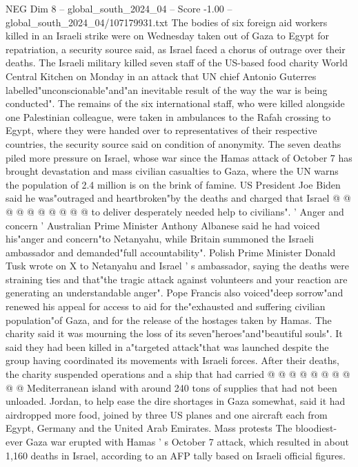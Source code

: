 \begin{textsample}{NEG Dim 8 – global\_south\_2024\_04 – Score -1.00 – global\_south\_2024\_04/107179931.txt}  \label{ex:f8_neg_036}
The bodies of six foreign aid workers killed in an Israeli strike were on Wednesday taken out of Gaza to Egypt for repatriation, a security source said, as Israel faced a chorus of outrage over their deaths.
The Israeli military killed seven staff of the US-based food charity World Central Kitchen on Monday in an attack that UN chief Antonio Guterres labelled"unconscionable"and"an inevitable result of the way the war is being conducted".
The remains of the six international staff, who were killed alongside one Palestinian colleague, were taken in ambulances to the Rafah crossing to Egypt, where they were handed over to representatives of their respective countries, the security source said on condition of anonymity.
The seven deaths piled more pressure on Israel, whose war since the Hamas attack of October 7 has brought devastation and mass civilian casualties to Gaza, where the UN warns the population of 2.4 million is on the brink of famine.
US President Joe Biden said he was"outraged and heartbroken"by the deaths and charged that Israel @ @ @ @ @ @ @ @ @ @ to deliver desperately needed help to civilians". ' Anger and concern ' Australian Prime Minister Anthony Albanese said he had voiced his"anger and concern"to Netanyahu, while Britain summoned the Israeli ambassador and demanded"full accountability".
Polish Prime Minister Donald Tusk wrote on X to Netanyahu and Israel ' s ambassador, saying the deaths were straining ties and that"the tragic attack against volunteers and your reaction are generating an understandable anger".
Pope Francis also voiced"deep sorrow"and renewed his appeal for access to aid for the"exhausted and suffering civilian population"of Gaza, and for the release of the hostages taken by Hamas.
The charity said it was mourning the loss of its seven"heroes"and"beautiful souls".
It said they had been killed in a"targeted attack"that was launched despite the group having coordinated its movements with Israeli forces.
After their deaths, the charity suspended operations and a ship that had carried @ @ @ @ @ @ @ @ @ @ Mediterranean island with around 240 tons of supplies that had not been unloaded.
Jordan, to help ease the dire shortages in Gaza somewhat, said it had airdropped more food, joined by three US planes and one aircraft each from Egypt, Germany and the United Arab Emirates.
Mass protests The bloodiest-ever Gaza war erupted with Hamas ' s October 7 attack, which resulted in about 1,160 deaths in Israel, according to an AFP tally based on Israeli official figures.

\end{textsample}
